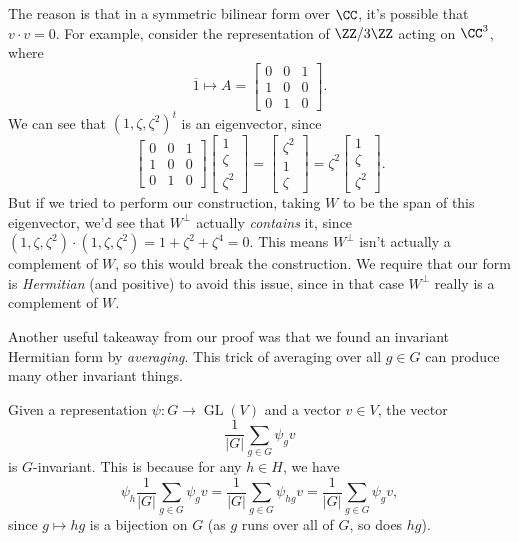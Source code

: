 The reason is that in a symmetric bilinear form over $\CC$, it's possible that $v \cdot v = 0$. For example, consider the representation of $\ZZ/3\ZZ$ acting on $\CC^3$, where \[\overline{1} \mapsto A = \begin{bmatrix} 0 & 0 & 1 \\ 1 & 0 & 0 \\ 0 & 1 & 0 \end{bmatrix}.\] We can see that $(1, \zeta, \zeta^2)^t$ is an eigenvector, since \[\begin{bmatrix} 0 & 0 & 1 \\ 1 & 0 & 0 \\ 0 & 1 & 0 \end{bmatrix}\begin{bmatrix} 1 \\ \zeta \\ \zeta^2 \end{bmatrix} = \begin{bmatrix} \zeta^2 \\ 1 \\ \zeta \end{bmatrix} = \zeta^2\begin{bmatrix} 1 \\ \zeta \\ \zeta^2 \end{bmatrix}.\] But if we tried to perform our construction, taking $W$ to be the span of this eigenvector, we'd see that $W^\perp$ actually \emph{contains} it, since $(1, \zeta, \zeta^2)\cdot (1, \zeta, \zeta^2) = 1 + \zeta^2 + \zeta^4 = 0$. This means $W^\perp$ isn't actually a complement of $W$, so this would break the construction. We require that our form is \emph{Hermitian} (and positive) to avoid this issue, since in that case $W^\perp$ really is a complement of $W$. 

Another useful takeaway from our proof was that we found an invariant Hermitian form by \emph{averaging}. This trick of averaging over all $g \in G$ can produce many other invariant things. 

\begin{example} \label{invariant vector by avg}
Given a representation $\psi : G \to \operatorname{GL}(V)$ and a vector $v \in V$, the vector \[\frac{1}{|G|} \sum_{g \in G} \psi_gv\] is $G$-invariant. This is because for any $h \in H$, we have \[\psi_h\frac{1}{|G|}\sum_{g \in G} \psi_gv = \frac{1}{|G|}\sum_{g \in G}\psi_{hg}v = \frac{1}{|G|}\sum_{g \in G} \psi_gv,\] since $g \mapsto hg$ is a bijection on $G$ (as $g$ runs over all of $G$, so does $hg$).   
\end{example}

